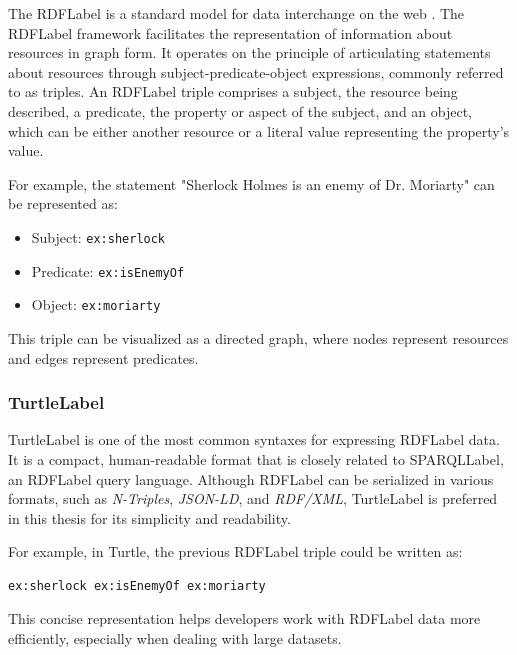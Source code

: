 The \acrlong{RDFLabel} is a standard model for data interchange on the web \cite{beckettDesignImplementationRedland2002, danbrickleyRDFSchema112014, mcbrideResourceDescriptionFramework2004}. The \acrshort{RDFLabel} framework facilitates the representation of information about resources in graph form. It operates on the principle of articulating statements about resources through subject-predicate-object expressions, commonly referred to as triples. An \acrshort{RDFLabel} triple comprises a subject, the resource being described, a predicate, the property or aspect of the subject, and an object, which can be either another resource or a literal value representing the property's value.

For example, the statement "Sherlock Holmes is an enemy of Dr. Moriarty" can be represented as:

\begin{itemize}
    \item Subject: \texttt{ex:sherlock}
    \item Predicate: \texttt{ex:isEnemyOf}
    \item Object: \texttt{ex:moriarty}
\end{itemize}

This triple can be visualized as a directed graph, where nodes represent resources and edges represent predicates.

\subsubsection{\acrfull{TurtleLabel}}\label{II-subsubsec:turtle}

\acrfull{TurtleLabel} is one of the most common syntaxes for expressing \acrshort{RDFLabel} data. It is a compact, human-readable format that is closely related to \acrshort{SPARQLLabel}, an \acrshort{RDFLabel} query language. Although \acrshort{RDFLabel} can be serialized in various formats, such as \textit{N-Triples}, \textit{JSON-LD}, and \textit{RDF/XML}, \acrshort{TurtleLabel} is preferred in this thesis for its simplicity and readability.

For example, in Turtle, the previous \acrshort{RDFLabel} triple could be written as:
\begin{lstlisting}[caption=Example triple in Turtle with prefixed names, label={lst:prefix-names}]
    ex:sherlock ex:isEnemyOf ex:moriarty
\end{lstlisting}

This concise representation helps developers work with \acrshort{RDFLabel} data more efficiently, especially when dealing with large datasets.

